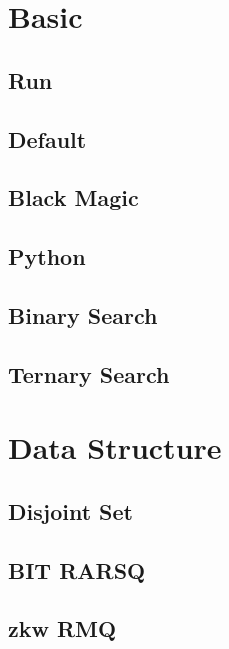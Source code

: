 \section{Basic}
    \subsection{Run}
        
    \subsection{Default}
        
    \subsection{Black Magic}
        
    \subsection{Python}
        
    \subsection{Binary Search}
        
    \subsection{Ternary Search}
        

\section{Data Structure}
    \subsection{Disjoint Set}
        
    \subsection{BIT RARSQ}
        
    \subsection{zkw RMQ}
        
